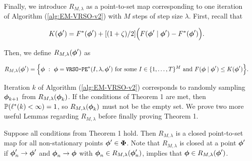 Finally, we introduce $R_{M,\lambda}$ as a point-to-set map corresponding to one iteration of Algorithm (\ref{alg:EM-VRSO-v2}) with $M$ steps of step size $\lambda$. First, recall that

\begin{equation}
    K(\boldsymbol{\phi}') = F^*(\boldsymbol{\phi}') + [(1 + \zeta)/2] \Big(F(\boldsymbol{\phi}' \mid \boldsymbol{\phi}') - F^*(\boldsymbol{\phi}') \Big). 
\end{equation}

Then, we define $R_{M,\lambda}(\boldsymbol{\phi}')$ as

\begin{equation}
    R_{M,\lambda}(\boldsymbol{\phi}') = \Big\{\boldsymbol{\phi} ~ : ~ \boldsymbol{\phi} = \texttt{VRSO-PE}^*(I,\lambda,\boldsymbol{\phi}') ~ \text{for some} ~ I \in \{1,\ldots,T\}^M ~\text{and}~ F(\boldsymbol{\phi} \mid \boldsymbol{\phi}') \leq K(\boldsymbol{\phi}')\Big\}.
\end{equation}

Iteration $k$ of Algorithm (\ref{alg:EM-VRSO-v2}) corresponds to randomly sampling $\boldsymbol{\phi}_{k+1}$ from $R_{M,\lambda}(\boldsymbol{\phi}_k)$. If the conditions of Theorem 1 are met, then $\mathbb{P}(\ell^*(k) < \infty) = 1$, so $R_{M,\lambda}(\boldsymbol{\phi}_k)$ must not be the empty set. We prove two more useful Lemmas regarding $R_{M,\lambda}$ before finally proving Theorem 1.

\begin{lemma}
    Suppose all conditions from Theorem 1 hold. Then $R_{M,\lambda}$ is a closed point-to-set map for all non-stationary points $\boldsymbol{\phi}' \in \boldsymbol{\Phi}$. Note that $R_{M,\lambda}$ is closed at a point $\boldsymbol{\phi}'$ if $\boldsymbol{\phi}'_{n} \to \boldsymbol{\phi}'$ and $\boldsymbol{\phi}_{n} \to \boldsymbol{\phi}$ with $\boldsymbol{\phi}_{n} \in R_{M,\lambda}(\boldsymbol{\phi}'_{n})$, implies that $\boldsymbol{\phi} \in R_{M,\lambda}(\boldsymbol{\phi}')$. 
\end{lemma}

